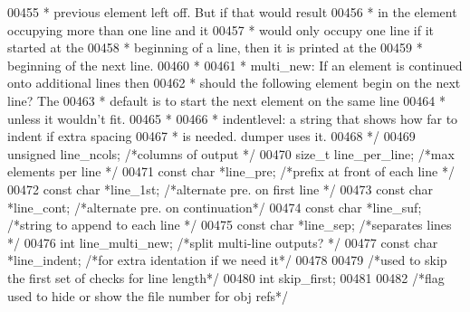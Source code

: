 \begin{DoxyCode}
{{{{{{{{{{{{{{{{{{{00455 \textcolor{comment}{     *                  previous element left off. But if that would result}
00456 \textcolor{comment}{     *                  in the element occupying more than one line and it}
00457 \textcolor{comment}{     *                  would only occupy one line if it started at the}
00458 \textcolor{comment}{     *                  beginning of a line, then it is printed at the}
00459 \textcolor{comment}{     *                  beginning of the next line.}
00460 \textcolor{comment}{     *}
00461 \textcolor{comment}{     *   multi\_new: If an element is continued onto additional lines then}
00462 \textcolor{comment}{     *              should the following element begin on the next line? The}
00463 \textcolor{comment}{     *              default is to start the next element on the same line}
00464 \textcolor{comment}{     *              unless it wouldn't fit.}
00465 \textcolor{comment}{     *}
00466 \textcolor{comment}{     * indentlevel: a string that shows how far to indent if extra spacing}
00467 \textcolor{comment}{     *              is needed. dumper uses it.}
00468 \textcolor{comment}{     */}
00469     \textcolor{keywordtype}{unsigned}    line\_ncols;             \textcolor{comment}{/*columns of output             */}
00470     \textcolor{keywordtype}{size\_t}      line\_per\_line;          \textcolor{comment}{/*max elements per line         */}
00471     \textcolor{keyword}{const} \textcolor{keywordtype}{char}  *line\_pre;              \textcolor{comment}{/*prefix at front of each line  */}
00472     \textcolor{keyword}{const} \textcolor{keywordtype}{char}  *line\_1st;              \textcolor{comment}{/*alternate pre. on first line  */}
00473     \textcolor{keyword}{const} \textcolor{keywordtype}{char}  *line\_cont;             \textcolor{comment}{/*alternate pre. on continuation*/}
00474     \textcolor{keyword}{const} \textcolor{keywordtype}{char}  *line\_suf;              \textcolor{comment}{/*string to append to each line */}
00475     \textcolor{keyword}{const} \textcolor{keywordtype}{char}  *line\_sep;              \textcolor{comment}{/*separates lines               */}
00476     \textcolor{keywordtype}{int}         line\_multi\_new;         \textcolor{comment}{/*split multi-line outputs?     */}
00477     \textcolor{keyword}{const} \textcolor{keywordtype}{char}  *line\_indent;           \textcolor{comment}{/*for extra identation if we need it*/}
00478 
00479     \textcolor{comment}{/*used to skip the first set of checks for line length*/}
00480     \textcolor{keywordtype}{int} skip\_first;
00481 
00482     \textcolor{comment}{/*flag used to hide or show the file number for obj refs*/}
}}}}}}}}}}}}}}}}}}}
\end{DoxyCode}
